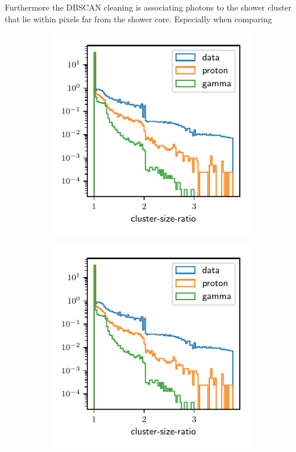 Furthermore the DBSCAN cleaning is associating photons to
the shower cluster that lie within pixels far from the shower core. Especially when comparing
%
\begin{figure}
  \begin{subfigure}{0.5\textwidth}
    \centering
    \includegraphics[width=\textwidth, page=23]{Plots/data_mc/features_DBSCAN.pdf}
  \end{subfigure}
  \begin{subfigure}{0.5\textwidth}
    \centering
    \includegraphics[width=\textwidth, page=13]{Plots/data_mc/features_DBSCAN.pdf}

\end{subfigure}
\end{figure}
